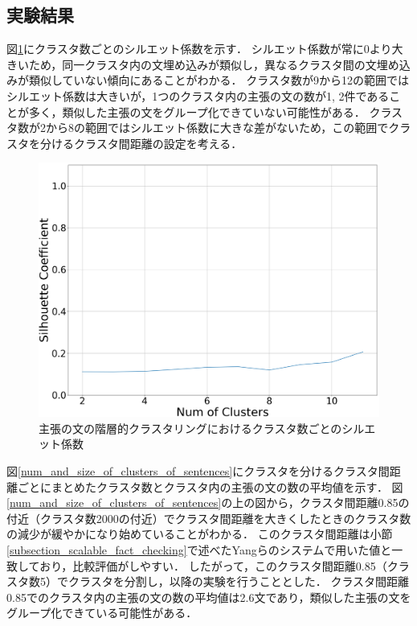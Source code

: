 \documentclass[12pt,a4j,dvipdfmx]{jreport}
\begin{document}

\newpage

\subsection{実験結果}

図\ref{sentences_silhouette}にクラスタ数ごとのシルエット係数を示す．
シルエット係数が常に0より大きいため，同一クラスタ内の文埋め込みが類似し，異なるクラスタ間の文埋め込みが類似していない傾向にあることがわかる．
クラスタ数が9から12の範囲ではシルエット係数は大きいが，1つのクラスタ内の主張の文の数が1, 2件であることが多く，類似した主張の文をグループ化できていない可能性がある．
クラスタ数が2から8の範囲ではシルエット係数に大きな差がないため，この範囲でクラスタを分けるクラスタ間距離の設定を考える．

\begin{figure}[H]
	\centering
	\includegraphics[keepaspectratio, width=120mm]{img/process-07_sentences-cluster_from-cluster-230_with-threshold-85_num-of-clusters-dependency-on-silhouette-coefficient.png}
	\caption{主張の文の階層的クラスタリングにおけるクラスタ数ごとのシルエット係数}
	\label{sentences_silhouette}
\end{figure}

\newpage

図\ref{num_and_size_of_clusters_of_sentences}にクラスタを分けるクラスタ間距離ごとにまとめたクラスタ数とクラスタ内の主張の文の数の平均値を示す．
図\ref{num_and_size_of_clusters_of_sentences}の上の図から，クラスタ間距離0.85の付近（クラスタ数2000の付近）でクラスタ間距離を大きくしたときのクラスタ数の減少が緩やかになり始めていることがわかる．
このクラスタ間距離は小節\ref{subsection_scalable_fact_checking}で述べたYangらのシステムで用いた値と一致しており，比較評価がしやすい\cite{yang_scalable_2021}．
したがって，このクラスタ間距離0.85（クラスタ数5）でクラスタを分割し，以降の実験を行うこととした．
クラスタ間距離0.85でのクラスタ内の主張の文の数の平均値は2.6文であり，類似した主張の文をグループ化できている可能性がある．
\end{document}
